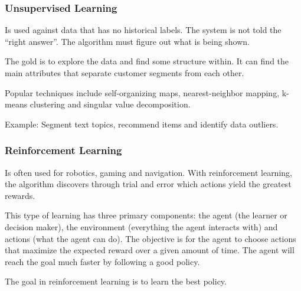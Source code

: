 \documentclass{article}
\begin{document}
\subsubsection{Unsupervised Learning}
\par Is used against data that has no historical labels. The system is not told the ``right answer''. The algorithm must figure out what is being shown.

\par The gold is to explore the data and find some structure within. It can find the main attributes that separate customer segments from each other.

\par Popular techniques include self-organizing maps, nearest-neighbor mapping, k-means clustering and singular value decomposition.

\par Example: Segment text topics, recommend items and identify data outliers.

\subsubsection{Reinforcement Learning}
\par Is often used for robotics, gaming and navigation. With reinforcement learning, the algorithm discovers through trial and error which actions yield the greatest rewards.

\par This type of learning has three primary components: the agent (the learner or decision maker), the environment (everything the agent interacts with) and actions (what the agent can do). The objective is for the agent to choose actions that maximize the expected reward over a given amount of time. The agent will reach the goal much faster by following a good policy.
\par The goal in reinforcement learning is to learn the best policy.
\end{document}

